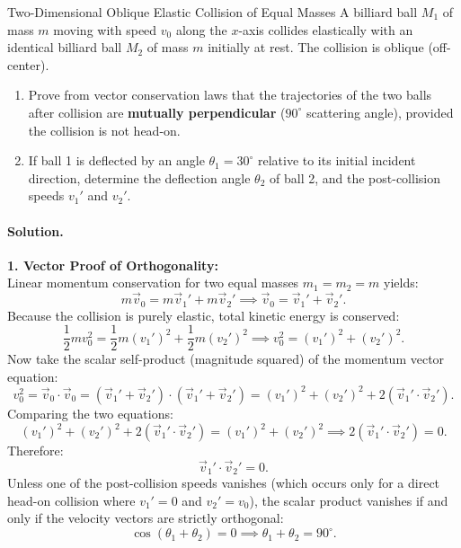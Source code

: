 \begin{workedexample}{Two-Dimensional Oblique Elastic Collision of Equal Masses}
A billiard ball $M_1$ of mass $m$ moving with speed $v_0$ along the $x$-axis collides elastically with an identical billiard ball $M_2$ of mass $m$ initially at rest. The collision is oblique (off-center).
\begin{enumerate}[leftmargin=1.4em,itemsep=3pt]
  \item Prove from vector conservation laws that the trajectories of the two balls after collision are \textbf{mutually perpendicular} ($90^\circ$ scattering angle), provided the collision is not head-on.
  \item If ball 1 is deflected by an angle $\theta_1 = 30^\circ$ relative to its initial incident direction, determine the deflection angle $\theta_2$ of ball 2, and the post-collision speeds $v_1'$ and $v_2'$.
\end{enumerate}

\paragraph{Solution.}
\textbf{1. Vector Proof of Orthogonality:}\\
Linear momentum conservation for two equal masses $m_1 = m_2 = m$ yields:
\[
m\vec{v}_0 = m\vec{v}_1' + m\vec{v}_2' \implies \vec{v}_0 = \vec{v}_1' + \vec{v}_2'.
\]
Because the collision is purely elastic, total kinetic energy is conserved:
\[
\frac{1}{2}m v_0^2 = \frac{1}{2}m (v_1')^2 + \frac{1}{2}m (v_2')^2 \implies v_0^2 = (v_1')^2 + (v_2')^2.
\]
Now take the scalar self-product (magnitude squared) of the momentum vector equation:
\[
v_0^2 = \vec{v}_0 \cdot \vec{v}_0 = (\vec{v}_1' + \vec{v}_2') \cdot (\vec{v}_1' + \vec{v}_2') = (v_1')^2 + (v_2')^2 + 2 (\vec{v}_1' \cdot \vec{v}_2').
\]
Comparing the two equations:
\[
(v_1')^2 + (v_2')^2 + 2 (\vec{v}_1' \cdot \vec{v}_2') = (v_1')^2 + (v_2')^2 \implies 2 (\vec{v}_1' \cdot \vec{v}_2') = 0.
\]
Therefore:
\begin{equation}
\vec{v}_1' \cdot \vec{v}_2' = 0.
\end{equation}
Unless one of the post-collision speeds vanishes (which occurs only for a direct head-on collision where $v_1' = 0$ and $v_2' = v_0$), the scalar product vanishes if and only if the velocity vectors are strictly orthogonal:
\[
\cos(\theta_1 + \theta_2) = 0 \implies \theta_1 + \theta_2 = 90^\circ.
\]


\end{workedexample}
